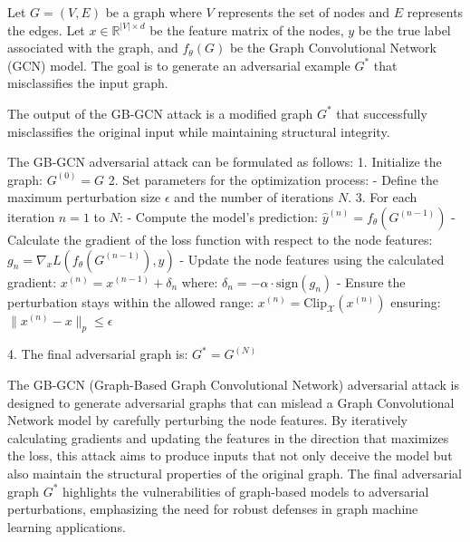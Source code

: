 Let $G = (V, E)$ be a graph where $V$ represents the set of nodes and $E$ represents the edges. Let $x \in \mathbb{R}^{|V| \times d}$ be the feature matrix of the nodes, $y$ be the true label associated with the graph, and $f_{\theta}(G)$ be the Graph Convolutional Network (GCN) model. The goal is to generate an adversarial example $G^*$ that misclassifies the input graph.

The output of the GB-GCN attack is a modified graph $G^*$ that successfully misclassifies the original input while maintaining structural integrity.

The GB-GCN adversarial attack can be formulated as follows:
1. Initialize the graph:
   $G^{(0)} = G$
2. Set parameters for the optimization process:
   - Define the maximum perturbation size $\epsilon$ and the number of iterations $N$.
3. For each iteration $n = 1$ to $N$:
   - Compute the model's prediction:
   $\hat{y}^{(n)} = f_{\theta}(G^{(n-1)})$
   - Calculate the gradient of the loss function with respect to the node features:
   $g_n = \nabla_x L(f_{\theta}(G^{(n-1)}), y)$
   - Update the node features using the calculated gradient:
   $x^{(n)} = x^{(n-1)} + \delta_n$
   where:
   $\delta_n = -\alpha \cdot \text{sign}(g_n)$
   - Ensure the perturbation stays within the allowed range:
   $x^{(n)} = \text{Clip}_{\mathcal{X}}(x^{(n)})$
   ensuring:
   $\|x^{(n)} - x\|_p \leq \epsilon$

4. The final adversarial graph is:
   $G^* = G^{(N)}$

The GB-GCN (Graph-Based Graph Convolutional Network) adversarial attack is designed to generate adversarial graphs that can mislead a Graph Convolutional Network model by carefully perturbing the node features. By iteratively calculating gradients and updating the features in the direction that maximizes the loss, this attack aims to produce inputs that not only deceive the model but also maintain the structural properties of the original graph. The final adversarial graph $G^*$ highlights the vulnerabilities of graph-based models to adversarial perturbations, emphasizing the need for robust defenses in graph machine learning applications.
